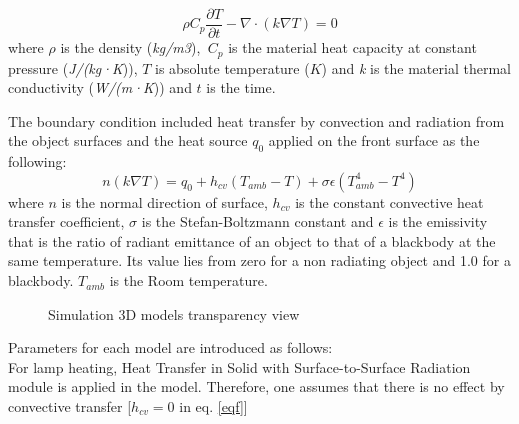 \documentclass{tQRT2e}
\begin{document}
\begin{equation}
\rho C_p \frac{\partial T}{\partial t}-\nabla \cdot (k\nabla T) = 0
\end{equation}
where $\rho$ is the density (\textit{kg/m3}),   $C_p$ is the material heat capacity at constant pressure (\textit{J/(kg·K})), $ T $ is absolute temperature ($ K $) and \textit{k} is the material thermal conductivity (\textit{W/(m·K})) and $ t $ is the time.

The boundary condition included heat transfer by convection and radiation from the object surfaces and the  heat  source $q_0 $  applied on the front surface as the following: 
\begin{equation}
n(k\nabla T) = q_0 + h_{cv}(T_{amb}-T)+\sigma \epsilon(T_{amb}^4-T^4)
\label{eqf}
\end{equation}
where $n$ is the normal direction of surface, $ h_{cv} $ is the constant convective heat transfer coefficient, $\sigma$ is the Stefan-Boltzmann constant  and $\epsilon$ is the emissivity that is the ratio of radiant emittance of an object to that of a blackbody at the same temperature. Its value lies from zero for a non radiating object and 1.0 for a blackbody. $ T_{amb} $ is the Room temperature.

\begin{figure}[ht]
    \hspace{-8pt}
    \hspace{-5pt}
	\caption{Simulation 3D models transparency view}
	\label{models}
\end{figure}
Parameters for each model are introduced as follows:\\
For lamp heating, Heat Transfer in Solid with Surface-to-Surface Radiation module is applied in the model. Therefore, one assumes that there is no effect by convective transfer [$h_{cv}=0$ in eq. \ref{eqf}]
\end{document}
